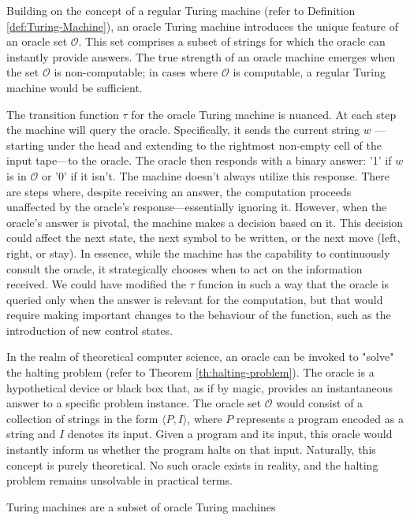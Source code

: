 Building on the concept of a regular Turing machine (refer to Definition \ref{def:Turing-Machine}), an oracle Turing machine introduces the unique feature of an oracle set $\mathcal{O}$. This set comprises a subset of strings for which the oracle can instantly provide answers. The true strength of an oracle machine emerges when the set $\mathcal{O}$ is non-computable; in cases where $\mathcal{O}$ is computable, a regular Turing machine would be sufficient.

The transition function $\tau$ for the oracle Turing machine is nuanced. At each step the machine will query the oracle. Specifically, it sends the current string $w$ —starting under the head and extending to the rightmost non-empty cell of the input tape—to the oracle. The oracle then responds with a binary answer: '1' if $w$ is in $\mathcal{O}$ or '0' if it isn't. The machine doesn't always utilize this response. There are steps where, despite receiving an answer, the computation proceeds unaffected by the oracle's response—essentially ignoring it. However, when the oracle's answer is pivotal, the machine makes a decision based on it. This decision could affect the next state, the next symbol to be written, or the next move (left, right, or stay). In essence, while the machine has the capability to continuously consult the oracle, it strategically chooses when to act on the information received. We could have modified the $\tau$ funcion in such a way that the oracle is queried only when the answer is relevant for the computation, but that would require making important changes to the behaviour of the function, such as the introduction of new control states.

\begin{example}
In the realm of theoretical computer science, an oracle can be invoked to "solve" the halting problem (refer to Theorem \ref{th:halting-problem}). The oracle is a hypothetical device or black box that, as if by magic, provides an instantaneous answer to a specific problem instance. The oracle set $\mathcal{O}$ would consist of a collection of strings in the form $\langle P, I \rangle$, where $P$ represents a program encoded as a string and $I$ denotes its input. Given a program and its input, this oracle would instantly inform us whether the program halts on that input. Naturally, this concept is purely theoretical. No such oracle exists in reality, and the halting problem remains unsolvable in practical terms.
\end{example}

{\color{red} Turing machines are a subset of oracle Turing machines}

